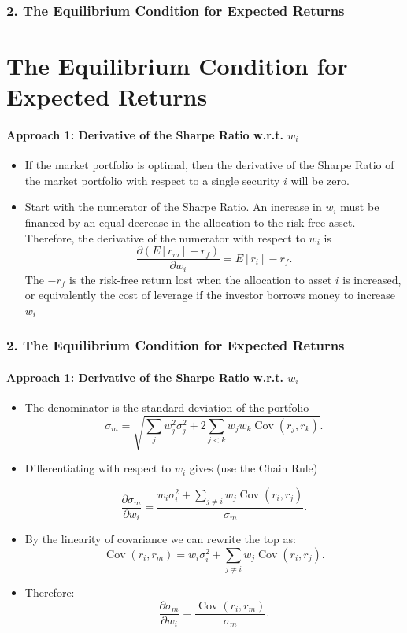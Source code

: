 \documentclass{beamer}
\begin{document}
\begin{frame}[t]
\frametitle{2. The Equilibrium Condition for Expected Returns}
    \section{The Equilibrium Condition for Expected Returns}
\framesubtitle{Approach 1: Derivative of the Sharpe Ratio w.r.t. $w_i$}

\begin{itemize}
    \item If the market portfolio is optimal, then the derivative of the Sharpe Ratio of the market portfolio with respect to a single security $i$ will be zero.  
    \item Start with the numerator of the Sharpe Ratio.  An increase in $w_i$ must be financed by an equal decrease in the allocation to the risk-free asset.   Therefore, the derivative of the numerator with respect to $w_i$ is 
    \[
    \frac{\partial (E[r_m]-r_f)}{\partial w_i}
    =
    E[r_i]-r_f.
    \]
    The $-r_f$ is the risk-free return lost when the allocation to
    asset $i$ is increased, or equivalently the cost of leverage if the investor borrows money to increase $w_i$


\end{itemize}

\end{frame}

\begin{frame}[t]
\frametitle{2. The Equilibrium Condition for Expected Returns}
\framesubtitle{Approach 1: Derivative of the Sharpe Ratio w.r.t. $w_i$}

\begin{itemize}
    \item The denominator is the standard deviation of the portfolio
    \[
    \sigma_m
    =
    \sqrt{
        \sum_j w_j^2\sigma_j^2
        +
        2\sum_{j<k}w_jw_k
        \operatorname{Cov}(r_j,r_k)
    }.
    \]
    \item Differentiating with respect to $w_i$ gives (use the Chain Rule)
    
    \[
    \frac{\partial \sigma_m}{\partial w_i}
    =
    \frac{
        w_i\sigma_i^2
        +
        \sum_{j\ne i}w_j\operatorname{Cov}(r_i,r_j)
    }{\sigma_m}.
    \]

    \item By the linearity of covariance we can rewrite the top as:
    \[
    \operatorname{Cov}(r_i,r_m)
    =
    w_i\sigma_i^2
    +
    \sum_{j\ne i}w_j\operatorname{Cov}(r_i,r_j).
    \]

    \item Therefore:
    \[
    \frac{\partial \sigma_m}{\partial w_i}
    =
    \frac{\operatorname{Cov}(r_i,r_m)}{\sigma_m}.
    \]
\end{itemize}

\end{frame}
\end{document}
